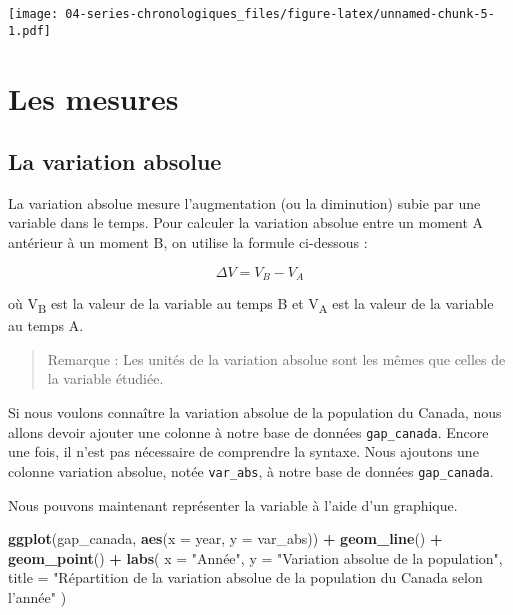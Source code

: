\documentclass[]{book}
\newenvironment{Shaded}{\begin{snugshade}}{\end{snugshade}}
\newcommand{\KeywordTok}[1]{\textcolor[rgb]{0.13,0.29,0.53}{\textbf{#1}}}
\newcommand{\DataTypeTok}[1]{\textcolor[rgb]{0.13,0.29,0.53}{#1}}
\newcommand{\StringTok}[1]{\textcolor[rgb]{0.31,0.60,0.02}{#1}}
\newcommand{\OperatorTok}[1]{\textcolor[rgb]{0.81,0.36,0.00}{\textbf{#1}}}
\newcommand{\NormalTok}[1]{#1}
\begin{document}
\texttt{[image: 04-series-chronologiques\_files/figure-latex/unnamed-chunk-5-1.pdf]}

\section{Les mesures}\label{les-mesures}

\subsection{La variation absolue}\label{la-variation-absolue}

La variation absolue mesure l'augmentation (ou la diminution) subie par
une variable dans le temps. Pour calculer la variation absolue entre un
moment A antérieur à un moment B, on utilise la formule ci-dessous :

\begin{equation}
\Delta V = V_B - V_A
\end{equation}

où V\textsubscript{B} est la valeur de la variable au temps B et
V\textsubscript{A} est la valeur de la variable au temps A.

\begin{quote}
Remarque : Les unités de la variation absolue sont les mêmes que celles
de la variable étudiée.
\end{quote}

Si nous voulons connaître la variation absolue de la population du
Canada, nous allons devoir ajouter une colonne à notre base de données
\texttt{gap\_canada}. Encore une fois, il n'est pas nécessaire de
comprendre la syntaxe. Nous ajoutons une colonne variation absolue,
notée \texttt{var\_abs}, à notre base de données \texttt{gap\_canada}.

\begin{Shaded}
\end{Shaded}

Nous pouvons maintenant représenter la variable à l'aide d'un graphique.

\begin{Shaded}
\begin{Highlighting}[]
\KeywordTok{ggplot}\NormalTok{(gap_canada, }\KeywordTok{aes}\NormalTok{(}\DataTypeTok{x =}\NormalTok{ year, }\DataTypeTok{y =}\NormalTok{ var_abs)) }\OperatorTok{+}
\StringTok{  }\KeywordTok{geom_line}\NormalTok{() }\OperatorTok{+}
\StringTok{  }\KeywordTok{geom_point}\NormalTok{() }\OperatorTok{+}
\StringTok{  }\KeywordTok{labs}\NormalTok{(}
    \DataTypeTok{x =} \StringTok{"Année"}\NormalTok{,}
    \DataTypeTok{y =} \StringTok{"Variation absolue de la population"}\NormalTok{,}
    \DataTypeTok{title =} \StringTok{"Répartition de la variation absolue de la population du Canada selon l'année"}
\NormalTok{  )}
\end{Highlighting}
\end{Shaded}
\end{document}
